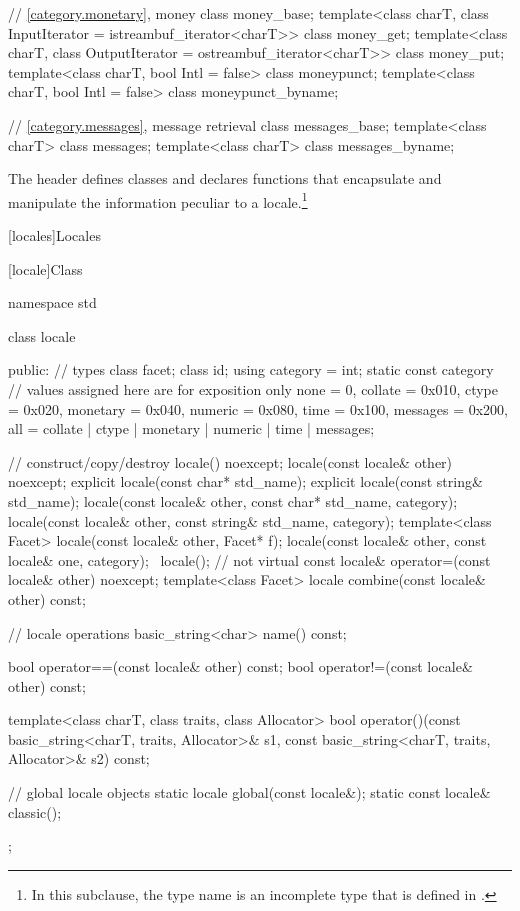 \begin{codeblock}
{  // \ref{category.monetary}, money
  class money_base;
  template<class charT, class InputIterator = istreambuf_iterator<charT>>
    class money_get;
  template<class charT, class OutputIterator = ostreambuf_iterator<charT>>
    class money_put;
  template<class charT, bool Intl = false>
    class moneypunct;
  template<class charT, bool Intl = false>
    class moneypunct_byname;

  // \ref{category.messages}, message retrieval
  class messages_base;
  template<class charT> class messages;
  template<class charT> class messages_byname;
}
\end{codeblock}

\pnum
The header
defines classes and declares functions that encapsulate and manipulate
the information peculiar to a locale.\footnote{In this subclause, the type name
is an incomplete type that is defined in
%
.}

[locales]{Locales}

[locale]{Class }

%
\begin{codeblock}
namespace std {
  class locale {
  public:
    // types
    class facet;
    class id;
    using category = int;
    static const category   // values assigned here are for exposition only
      none     = 0,
      collate  = 0x010, ctype    = 0x020,
      monetary = 0x040, numeric  = 0x080,
      time     = 0x100, messages = 0x200,
      all = collate | ctype | monetary | numeric | time  | messages;

    // construct/copy/destroy
    locale() noexcept;
    locale(const locale& other) noexcept;
    explicit locale(const char* std_name);
    explicit locale(const string& std_name);
    locale(const locale& other, const char* std_name, category);
    locale(const locale& other, const string& std_name, category);
    template<class Facet> locale(const locale& other, Facet* f);
    locale(const locale& other, const locale& one, category);
    ~locale();                  // not virtual
    const locale& operator=(const locale& other) noexcept;
    template<class Facet> locale combine(const locale& other) const;

    // locale operations
    basic_string<char> name() const;

    bool operator==(const locale& other) const;
    bool operator!=(const locale& other) const;

    template<class charT, class traits, class Allocator>
      bool operator()(const basic_string<charT, traits, Allocator>& s1,
                      const basic_string<charT, traits, Allocator>& s2) const;

    // global locale objects
    static       locale  global(const locale&);
    static const locale& classic();
  };
}
\end{codeblock}

